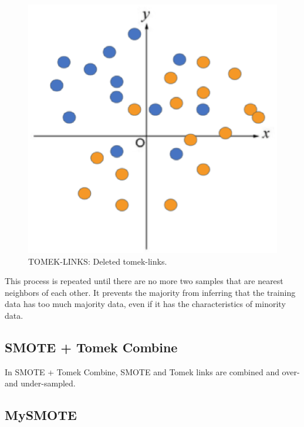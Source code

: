 \begin{center}
    \begin{figure}[ht]
        \caption{TOMEK-LINKS: Deleted tomek-links.}
        \label{tab:team-rating-features}
        \begin{center}
            \includegraphics[scale=0.6]{image/tomek3.eps}
        \end{center}
    \end{figure}
\end{center}

This process is repeated until there are no more two samples that are nearest neighbors of each other.
It prevents the majority from inferring that the training data has too much majority data, even if it has the characteristics of minority data.

\clearpage

\subsection{SMOTE + Tomek Combine}
In SMOTE + Tomek Combine, SMOTE and Tomek links are combined and over- and under-sampled.

\subsection{MySMOTE}

